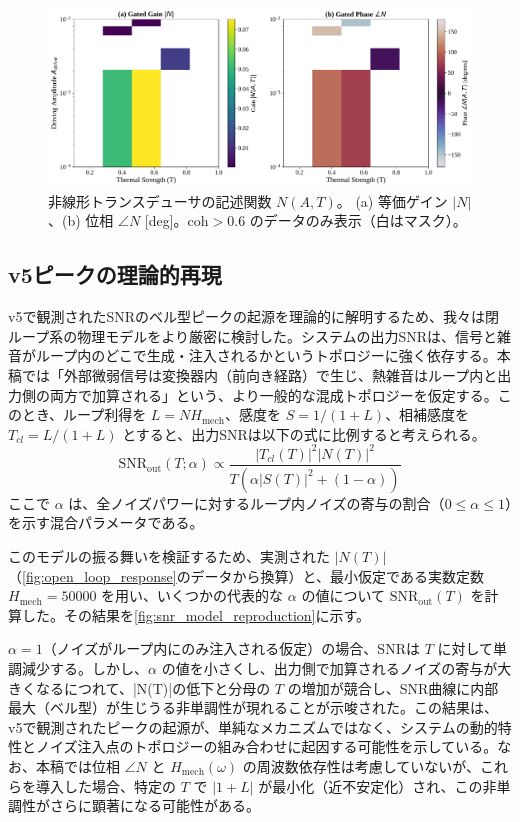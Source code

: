 \documentclass[a4paper,11pt,ja=standard,lualatex]{bxjsarticle}
\newcommand{\figref}[1]{\cref{#1}}
\begin{document}
\begin{figure}[H]
\centering
\includegraphics[width=\linewidth]{fig5_describing_function.pdf}
\caption{非線形トランスデューサの記述関数 $N(A,T)$。 (a) 等価ゲイン $|N|$、(b) 位相 $\angle N$ [deg]。$\mathrm{coh}>0.6$ のデータのみ表示（白はマスク）。}
\label{fig:describing_function}
\end{figure}

\FloatBarrier

\subsection{v5ピークの理論的再現}
v5で観測されたSNRのベル型ピークの起源を理論的に解明するため、我々は閉ループ系の物理モデルをより厳密に検討した。システムの出力SNRは、信号と雑音がループ内のどこで生成・注入されるかというトポロジーに強く依存する。本稿では「外部微弱信号は変換器内（前向き経路）で生じ、熱雑音はループ内と出力側の両方で加算される」という、より一般的な混成トポロジーを仮定する。このとき、ループ利得を $L=NH_{\mathrm{mech}}$、感度を $S=1/(1+L)$、相補感度を $T_{cl}=L/(1+L)$ とすると、出力SNRは以下の式に比例すると考えられる。
\begin{equation}
 \mathrm{SNR}_{\mathrm{out}}(T; \alpha) \propto \frac{|T_{cl}(T)|^2 |N(T)|^2}{T \left( \alpha |S(T)|^2 + (1-\alpha) \right) }
 \label{eq:snr_model}
\end{equation}
ここで $\alpha$ は、全ノイズパワーに対するループ内ノイズの寄与の割合（$0 \le \alpha \le 1$）を示す混合パラメータである。

このモデルの振る舞いを検証するため、実測された $|N(T)|$（\figref{fig:open_loop_response}のデータから換算）と、最小仮定である実数定数 $H_{\mathrm{mech}}=50000$ を用い、いくつかの代表的な $\alpha$ の値について $\mathrm{SNR}_{\mathrm{out}}(T)$ を計算した。その結果を\figref{fig:snr_model_reproduction}に示す。

$\alpha=1$（ノイズがループ内にのみ注入される仮定）の場合、SNRは $T$ に対して単調減少する。しかし、$\alpha$ の値を小さくし、出力側で加算されるノイズの寄与が大きくなるにつれて、|N(T)|の低下と分母の $T$ の増加が競合し、SNR曲線に内部最大（ベル型）が生じうる非単調性が現れることが示唆された。この結果は、v5で観測されたピークの起源が、単純なメカニズムではなく、システムの動的特性とノイズ注入点のトポロジーの組み合わせに起因する可能性を示している。なお、本稿では位相 $\angle N$ と $H_{\mathrm{mech}}(\omega)$ の周波数依存性は考慮していないが、これらを導入した場合、特定の $T$ で $|1+L|$ が最小化（近不安定化）され、この非単調性がさらに顕著になる可能性がある。
\end{document}
